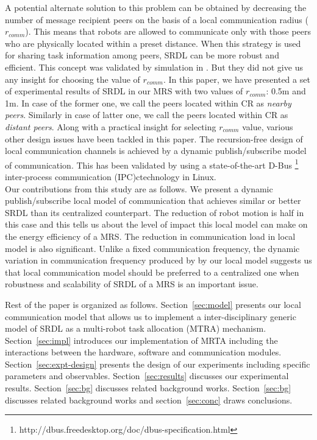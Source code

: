 \documentclass[letterpaper, 10 pt, conference]{ieeeconf}  %
\begin{document}
A potential alternate solution to this problem can be obtained by decreasing the number of message recipient peers on the basis of a local communication radius ($r_{comm}$). This means that robots are allowed to communicate only with those peers who are physically located within a preset distance. When this strategy is used for sharing task information among peers, SRDL can be more robust and efficient. This concept was validated by simulation in \cite{Agassounon}. But they did not give us any insight for choosing the value of $r_{comm}$. In this paper, we have presented a set of experimental results of SRDL in our MRS with two values of $r_{comm}$: 0.5m and 1m. In case of the former one, we call the peers located within CR as {\em nearby peers}. Similarly in case of latter one, we call the peers located within CR as {\em distant peers}. Along with a practical insight for selecting $r_{comm}$ value, various other design issues have been tackled in this paper. The recursion-free design of  local communication channels is achieved by a dynamic publish/subscribe model of communication. This has been validated by using a state-of-the-art D-Bus \footnote{http://dbus.freedesktop.org/doc/dbus-specification.html} inter-process communication (IPC)ctechnology in Linux.\\
Our contributions from this study are as follows. We present a dynamic publish/subscribe local model of communication that achieves similar or better SRDL than its centralized counterpart. The reduction of robot motion is half in this case and this tells us about the level of impact this local model can make on the energy efficiency of a MRS. The reduction in communication load in local model  is also significant.  Unlike a fixed communication frequency, the dynamic variation in communication frequency produced by by our local model suggests us that local communication model should be preferred to a centralized one when robustness and scalability of SRDL of a MRS is an important issue.

Rest of the paper is organized as follows.  Section~\ref{sec:model} presents our local communication model that allows us to implement a inter-disciplinary generic model of SRDL as a multi-robot task allocation (MTRA) mechanism. Section~\ref{sec:impl} introduces our implementation of MRTA including the interactions between the hardware, software and communication modules. Section~\ref{sec:expt-design} presents the design of our experiments including specific parameters and observables. Section~\ref{sec:results} discusses our experimental results. Section~\ref{sec:bg} discusses related background works. Section~\ref{sec:bg} discusses related background works and section~\ref{sec:conc} draws conclusions.
%
\end{document}

